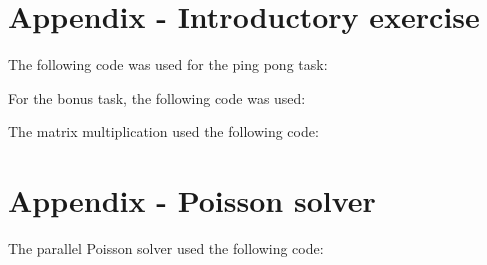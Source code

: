 \section*{Appendix - Introductory exercise}
\label{app:pingpong}
The following code was used for the ping pong task:

For the bonus task, the following code was used:


\label{app:mm}
The matrix multiplication used the following code: 


\section*{Appendix - Poisson solver}
\label{app:poisson}
The parallel Poisson solver used the following code:


